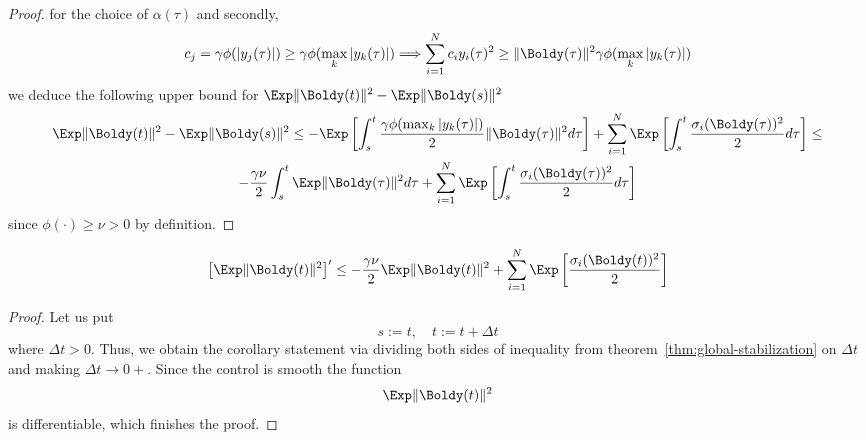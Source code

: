 \begin{proof}
    for the choice of $\alpha(\tau)$ and secondly, 
    \[
        c_j = \gamma \phi(|y_j(\tau)|) \geq \gamma \phi(\max_k|y_k(\tau)|) \Longrightarrow \sum_{i=1}^N c_i y_i(\tau)^2 \geq  \|\Boldy(\tau)\|^2  \gamma \phi(\max_k|y_k(\tau)|) 
    \]
    we deduce the following upper bound for  $\Exp \|\Boldy(t)\|^2 - \Exp \|\Boldy(s)\|^2$
    \begin{multline*}
        \Exp \|\Boldy(t)\|^2 - \Exp \|\Boldy(s)\|^2 \leq - \Exp\left[\int_s^t\frac{\gamma \phi(\max_k|y_k(\tau)|)}{2} \|\Boldy(\tau)\|^2 d\tau\right]+ \sum_{i=1}^N \Exp \left[ \int_s^{t} \frac{\sigma_i(\Boldy(\tau))^2}{2} d\tau\right]  \leq \\ 
        - \frac{\gamma \nu }{2} \int_s^t \Exp \|\Boldy(\tau)\|^2 d\tau + \sum_{i=1}^N \Exp \left[ \int_s^{t} \frac{\sigma_i(\Boldy(\tau))^2}{2} d\tau\right] 
    \end{multline*}
    since $\phi(\cdot) \geq \nu > 0$ by definition.
\end{proof}

\begin{corollary}\label{col:derivative}
    \[
        \left[ \Exp \|\Boldy(t)\|^2\right] ' \leq  - \frac{\gamma \nu }{2} \Exp \|\Boldy(t)\|^2   + \sum_{i=1}^N \Exp \left[ \frac{\sigma_i(\Boldy(t))^2}{2} \right]
    \] 
\end{corollary}
\begin{proof}
    Let us put
    \[
        s := t, \quad t := t + \Delta t
    \]
    where $\Delta t > 0$. Thus, we obtain the corollary statement via dividing both sides 
    of inequality from theorem~\ref{thm:global-stabilization} on $\Delta t$ and making $\Delta t \rightarrow 0+$.
    Since the control is smooth the function
    \[
        \Exp \|\Boldy(t)\| ^ 2 
    \]
    is differentiable, which finishes the proof.
\end{proof}
